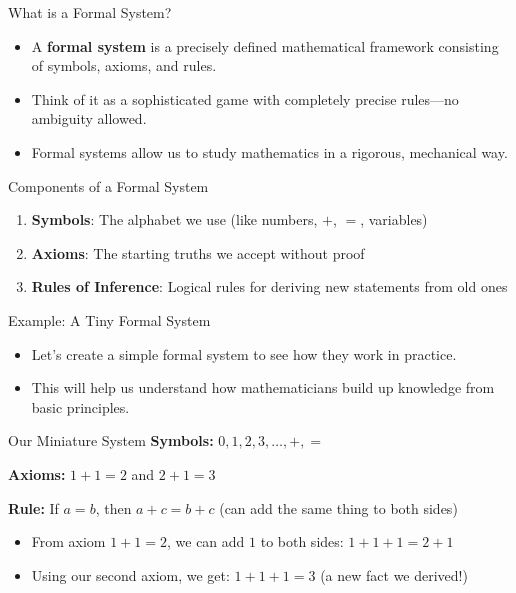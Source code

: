 \documentclass[aspectratio=169]{beamer}
\begin{document}
\begin{frame}{What is a Formal System?}

\begin{itemize}
    \item A \textbf{formal system} is a precisely defined mathematical framework consisting of symbols, axioms, and rules.
    \item Think of it as a sophisticated game with completely precise rules—no ambiguity allowed.
    \item Formal systems allow us to study mathematics in a rigorous, mechanical way.
\end{itemize}

\begin{block}{Components of a Formal System}
\begin{enumerate}
    \item \textbf{Symbols}: The alphabet we use (like numbers, $+$, $=$, variables)
    \item \textbf{Axioms}: The starting truths we accept without proof
    \item \textbf{Rules of Inference}: Logical rules for deriving new statements from old ones
\end{enumerate}
\end{block}

\end{frame}

\begin{frame}{Example: A Tiny Formal System}

\begin{itemize}
    \item Let's create a simple formal system to see how they work in practice.
    \item This will help us understand how mathematicians build up knowledge from basic principles.
\end{itemize}

\begin{block}{Our Miniature System}
\textbf{Symbols:} $0, 1, 2, 3, \ldots, +, =$

\textbf{Axioms:} $1 + 1 = 2$ and $2 + 1 = 3$

\textbf{Rule:} If $a = b$, then $a + c = b + c$ (can add the same thing to both sides)
\end{block}

\begin{itemize}
    \item From axiom $1 + 1 = 2$, we can add $1$ to both sides: $1 + 1 + 1 = 2 + 1$
    \item Using our second axiom, we get: $1 + 1 + 1 = 3$ (a new fact we derived!)
\end{itemize}

\end{frame}
\end{document}
